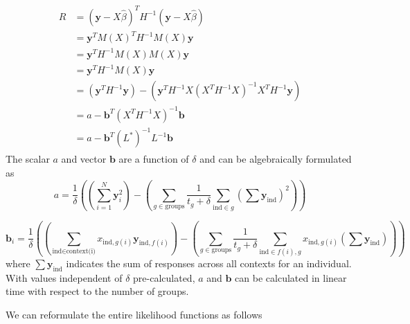         \begin{align}
        \begin{split}
            R & = (\mathbf{y}-X\hat{\beta})^TH^{-1}(\mathbf{y}-X\hat{\beta})    \\
              & = \mathbf{y}^TM(X)^TH^{-1}M(X)\mathbf{y} \\
              & = \mathbf{y}^TH^{-1}M(X)M(X)\mathbf{y} \\
              & = \mathbf{y}^TH^{-1}M(X)\mathbf{y} \\
              & = (\mathbf{y}^TH^{-1}\mathbf{y}) - (\mathbf{y}^TH^{-1}X(X^TH^{-1}X)^{-1}X^TH^{-1}\mathbf{y}) \\
              & = a - \mathbf{b}^T(X^TH^{-1}X)^{-1}\mathbf{b} \\
              & = a - \mathbf{b}^T(L^*)^{-1}L^{-1}\mathbf{b}
        \end{split}
        \end{align}
        The scalar $a$ and vector $\mathbf{b}$ are a function of $\delta$ and can be algebraically formulated as
        \begin{equation}
            a = \frac{1}{\delta}\left(\left(\sum_{i=1}^{N}\mathbf{y}_i^2\right) - \left(\sum\limits_{g \in \text{groups}} \frac{1}{t_g + \delta}\sum\limits_{\text{ind} \in g}(\sum\mathbf{y}_{\text{ind}})^2\right)\right)
        \end{equation}
        
        \begin{equation}
            \mathbf{b}_i = \frac{1}{\delta}\left(\left(\sum\limits_{\text{ind} \in \text{context(i)}} x_{\text{ind},g(i)}\mathbf{y}_{\text{ind},f(i)}\right) - \left(\sum\limits_{g \in \text{groups}} \frac{1}{t_g + \delta}\sum\limits_{\text{ind} \in f(i),g} x_{\text{ind},g(i)}(\sum\mathbf{y}_{\text{ind}}) \right)\right)
        \end{equation}
        where $\sum\mathbf{y}_{\text{ind}}$ indicates the sum of responses across all contexts for an individual. With values independent of $\delta$ pre-calculated, $a$ and $\mathbf{b}$ can be calculated in linear time with respect to the number of groups. 
        
        We can reformulate the entire likelihood functions as follows
        

